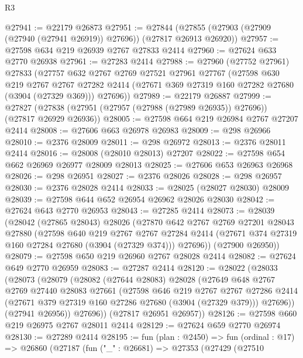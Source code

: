 \begin{lexlean}{R3}
\begin{coremodule}
@27941 := @22179 @26873
@27951 := @27844 (@27855 (@27903 (@27909 (@27940 (@27941 @26919)) @27696)) (@27817 @26913 @26920))
@27957 := @27598 @634 @219 @26939 @2767 @27833 @2414
@27960 := @27624 @633 @2770 @26938
@27961 := @27283 @2414
@27988 := @27960
    (@27752 @27961)
    @27833
    (@27757
      @632
      @2767
      @2769
      @27521
      @27961
      @27767
      (@27598
        @630
        @219
        @2767
        @2767
        @27282
        @2414
        (@27671 @369 @27319 @160 @27282 @27680 (@3904 (@27329 @369)))
        @27696))
@27989 := @22179 @26887
@27999 := @27827 (@27838 (@27951 (@27957 (@27988 (@27989 @26935)) @27696)) (@27817 @26929 @26936))
@28005 := @27598 @664 @219 @26984 @2767 @27207 @2414
@28008 := @27606 @663 @26978 @26983
@28009 := @298 @26966
@28010 := @2376 @28009
@28011 := @298 @26972
@28013 := @2376 @28011 @2414
@28016 := @28008 (@28010 @28013) @27207
@28022 := @27598 @654 @662 @26969 @26977 @28009 @28013
@28025 := @27606 @653 @26963 @26968
@28026 := @298 @26951
@28027 := @2376 @28026
@28028 := @298 @26957
@28030 := @2376 @28028 @2414
@28033 := @28025 (@28027 @28030) @28009
@28039 := @27598 @644 @652 @26954 @26962 @28026 @28030
@28042 := @27624 @643 @2770 @26953
@28043 := @27285 @2414
@28073 := @28039
    (@28042
      (@27865 @28043)
      @28026
      (@27870
        @642
        @2767
        @2769
        @27201
        @28043
        @27880
        (@27598
          @640
          @219
          @2767
          @2767
          @27284
          @2414
          (@27671 @374 @27319 @160 @27284 @27680 (@3904 (@27329 @374)))
          @27696))
      (@27900 @26950))
@28079 := @27598 @650 @219 @26960 @2767 @28028 @2414
@28082 := @27624 @649 @2770 @26959
@28083 := @27287 @2414
@28120 := @28022
    (@28033
      (@28073
        (@28079
          (@28082
            (@27644 @28083)
            @28028
            (@27649
              @648
              @2767
              @2769
              @27440
              @28083
              @27661
              (@27598
                @646
                @219
                @2767
                @2767
                @27286
                @2414
                (@27671 @379 @27319 @160 @27286 @27680 (@3904 (@27329 @379)))
                @27696))
            (@27941 @26956))
          @27696))
      (@27817 @26951 @26957))
@28126 := @27598 @660 @219 @26975 @2767 @28011 @2414
@28129 := @27624 @659 @2770 @26974
@28130 := @27289 @2414
@28195 := fun (plan : @2450) =>
  fun (ordinal : @17) =>
  @26860
    (@27187
      (fun ("_" : @26681) =>
      @27353
        (@27429
          (@27510

\end{coremodule}
\end{lexlean}

